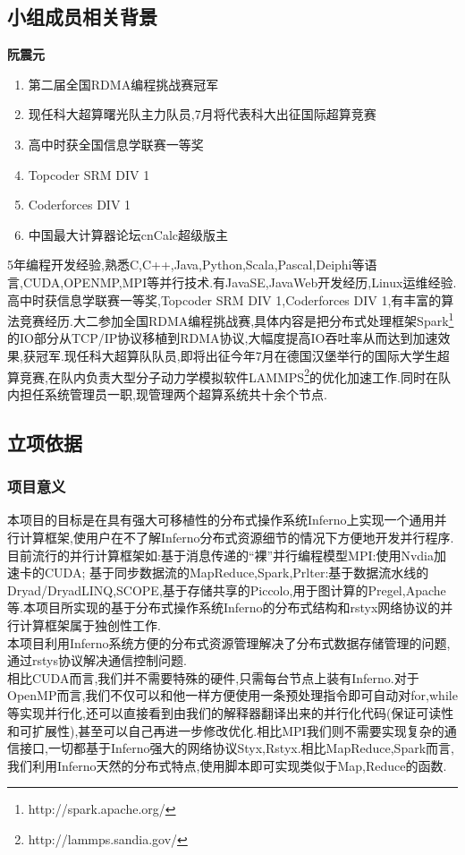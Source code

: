 \documentclass[paper=a4]{ctexart} %
\numberwithin{equation}{section} %
\numberwithin{figure}{section} %
\numberwithin{table}{section} %
\newcommand{\n}{\\\indent}
\begin{document}
\subsection{小组成员相关背景}
\begin{center}
  \bf{阮震元}
\end{center}
\begin{enumerate}
\item 第二届全国RDMA编程挑战赛冠军
\item 现任科大超算曙光队主力队员,7月将代表科大出征国际超算竞赛
\item 高中时获全国信息学联赛一等奖
\item Topcoder SRM DIV 1
\item Coderforces DIV 1
\item 中国最大计算器论坛cnCalc超级版主
 \end{enumerate}
\hspace{0.75cm}
5年编程开发经验,熟悉C,C++,Java,Python,Scala,Pascal,Deiphi等语言,CUDA,OPENMP,MPI等并行技术.有JavaSE,JavaWeb开发经历,Linux运维经验.高中时获信息学联赛一等奖,Topcoder SRM DIV 1,Coderforces DIV 1,有丰富的算法竞赛经历.大二参加全国RDMA编程挑战赛,具体内容是把分布式处理框架Spark\footnote{http://spark.apache.org/}的IO部分从TCP/IP协议移植到RDMA协议,大幅度提高IO吞吐率从而达到加速效果,获冠军.现任科大超算队队员,即将出征今年7月在德国汉堡举行的国际大学生超算竞赛,在队内负责大型分子动力学模拟软件LAMMPS\footnote{http://lammps.sandia.gov/}的优化加速工作.同时在队内担任系统管理员一职,现管理两个超算系统共十余个节点.

\subsection{立项依据}

\subsubsection{项目意义}
本项目的目标是在具有强大可移植性的分布式操作系统Inferno上实现一个通用并行计算框架,使用户在不了解Inferno分布式资源细节的情况下方便地开发并行程序.\n
 目前流行的并行计算框架如:基于消息传递的“裸”并行编程模型MPI:使用Nvdia加速卡的CUDA; 基于同步数据流的MapReduce,Spark,Prlter:基于数据流水线的Dryad/DryadLINQ,SCOPE,基于存储共享的Piccolo,用于图计算的Pregel,Apache等.本项目所实现的基于分布式操作系统Inferno的分布式结构和rstyx网络协议的并行计算框架属于独创性工作.\n
本项目利用Inferno系统方便的分布式资源管理解决了分布式数据存储管理的问题,通过rstys协议解决通信控制问题.\n
相比CUDA而言,我们并不需要特殊的硬件,只需每台节点上装有Inferno.对于OpenMP而言,我们不仅可以和他一样方便使用一条预处理指令即可自动对for,while等实现并行化,还可以直接看到由我们的解释器翻译出来的并行化代码(保证可读性和可扩展性),甚至可以自己再进一步修改优化.相比MPI我们则不需要实现复杂的通信接口,一切都基于Inferno强大的网络协议Styx,Rstyx.相比MapReduce,Spark而言,我们利用Inferno天然的分布式特点,使用脚本即可实现类似于Map,Reduce的函数.
\end{document}
